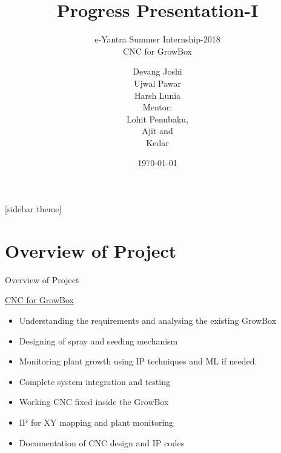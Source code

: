 \documentclass[12pt, a4paper]{beamer}
\begin{document}
	\title{Progress Presentation-I}
	\subtitle{e-Yantra Summer Internship-2018 \\ CNC for GrowBox}
	\author{Devang Joshi\\Ujwal Pawar\\Harsh Lunia\\
	Mentor: \\Lohit Penubaku,\\Ajit and\\Kedar}
	\date{\today}
	\frame{\titlepage}

[sidebar theme]
\section{Overview of Project}
\begin{frame}{Overview of Project}

		\centering \LARGE \underline {CNC for GrowBox}

\end{frame}	

\begin{frame}
		\begin{itemize} \vspace{2mm}
			\item Understanding the requirements and analysing the existing GrowBox
			\item Designing of spray and seeding mechanism
			\item Monitoring plant growth using IP techniques and ML if needed. 
			\item Complete system integration and testing 
		\end{itemize}
\end{frame}	

\begin{frame}
		\begin{itemize} \vspace{2mm}
			\item Working CNC fixed inside the GrowBox
			\item IP for XY mapping and plant monitoring
			\item Documentation of CNC design and IP codes
		\end{itemize}
\end{frame}	
\end{document}

